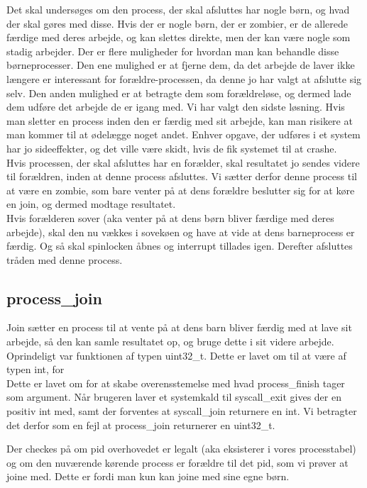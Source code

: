 \documentclass[10pt,a4paper,danish]{article}
\begin{document}
Det skal undersøges om den process, der skal afsluttes har nogle børn, og hvad der skal gøres med disse. Hvis der er nogle børn, der er zombier, er de allerede færdige med deres arbejde, og kan slettes direkte, men der kan være nogle som stadig arbejder. Der er flere muligheder for hvordan man kan behandle disse børneprocesser. Den ene mulighed er at fjerne dem, da det arbejde de laver ikke længere er interessant for forældre-processen, da denne jo har valgt at afslutte sig selv. Den anden mulighed er at betragte dem som forældreløse, og dermed lade dem udføre det arbejde de er igang med. Vi har valgt den sidste løsning. Hvis man sletter en process inden den er færdig med sit arbejde, kan man risikere at man kommer til at ødelægge noget andet. Enhver opgave, der udføres i et system har jo sideeffekter, og det ville være skidt, hvis de fik systemet til at crashe.\\

Hvis processen, der skal afsluttes har en forælder, skal resultatet jo sendes videre til forældren, inden at denne process afsluttes. Vi sætter derfor denne process til at være en zombie, som bare venter på at dens forældre beslutter sig for at køre en join, og dermed modtage resultatet. \\

Hvis forælderen sover (aka venter på at dens børn bliver færdige med deres arbejde), skal den nu vækkes i sovekøen og have at vide at dens barneprocess er færdig. Og så skal spinlocken åbnes og interrupt tillades igen. Derefter afsluttes tråden med denne process.

\subsection{process\_join}
Join sætter en process til at vente på at dens barn bliver færdig med at lave sit arbejde, så den kan samle resultatet op, og bruge dette i sit videre arbejde. Oprindeligt var funktionen af typen uint32\_t. Dette er lavet om til at være af typen int, for  \\
Dette er lavet om for at skabe overensstemelse med hvad process_finish tager som argument. Når brugeren laver et systemkald til syscall_exit gives der en positiv int med, samt der forventes at syscall_join returnere en int. Vi betragter det derfor som en fejl at process_join returnerer en uint32_t.

Der checkes på om pid overhovedet er legalt (aka eksisterer i vores processtabel) og om den nuværende kørende process er forældre til det pid, som vi prøver at joine med. Dette er fordi man kun kan joine med sine egne børn.\\
\end{document}
